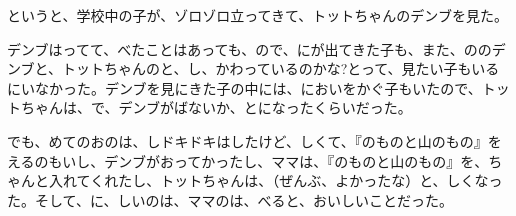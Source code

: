 というと、学校中の子が、ゾロゾロ立ってきて、トットちゃんのデンブを見た。

デンブはってて、べたことはあっても、ので、にが出てきた子も、また、ののデンブと、トットちゃんのと、し、かわっているのかな?とって、見たい子もいるにいなかった。デンブを見にきた子の中には、においをかぐ子もいたので、トットちゃんは、で、デンブがばないか、とになったくらいだった。

でも、めてのおのは、しドキドキはしたけど、しくて、『のものと山のもの』をえるのもいし、デンブがおってかったし、ママは、『のものと山のもの』を、ちゃんと入れてくれたし、トットちゃんは、（ぜんぶ、よかったな）と、しくなった。そして、に、しいのは、ママのは、べると、おいしいことだった。


